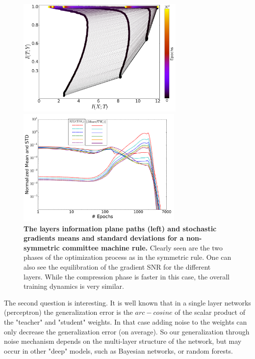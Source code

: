 \documentclass[11pt]{article}
\begin{document}
\begin{figure}[ht]
\begin{center}
\begin{minipage}[c]{0.5\linewidth}
\includegraphics[width=\textwidth,height=5.8cm]{inf_plane_new_problem.pdf}
\end{minipage}%
\begin{minipage}[c]{0.5\linewidth}
\includegraphics[width=\textwidth,height=5.8cm, scale = 0.5]{log_log_gradients_new_problem.pdf}
\end{minipage}

\end{center}
\caption{\textbf{The layers information plane paths (left) and stochastic gradients means and standard deviations for a non-symmetric committee machine rule.} Clearly seen are the two phases of the optimization process as in the symmetric rule. One can also see the equilibration of the gradient SNR for the different layers. While the compression phase is faster in this case, the overall training dynamics is very similar.}
\label{committee-machine}
\vskip -0.1in
\end{figure}

The second question is interesting. It is well known that in a single layer networks (perceptron) the generalization error is the $arc-cosine$ of the scalar product of the "teacher" and "student" weights. In that case adding noise to the weights can only decrease the generalization error (on average). So our generalization through noise mechanism depends on the multi-layer structure of the network, but may occur in other "deep" models, such as Bayesian networks, or random forests.     
\end{document}
